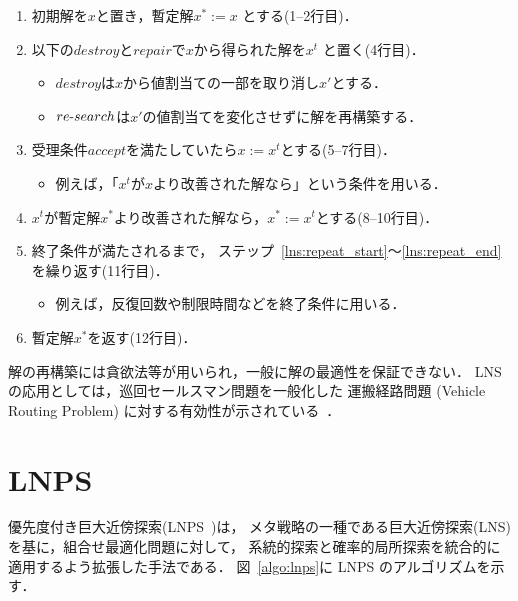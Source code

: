 \begin{enumerate}\compress
\item 初期解を$x$と置き，暫定解$x^{*} := x$ とする(1--2行目)．
\item \label{lns:repeat_start}
  以下の$destroy$と$repair$で$x$から得られた解を$x^{t}$
  と置く(4行目)．
  \begin{itemize}\compress
  \item $destroy$は$x$から値割当ての一部を取り消し$x'$とする．
  \item $re\mathchar`-search$は$x'$の値割当てを変化させずに解を再構築する．
  \end{itemize}
\item 受理条件$accept$を満たしていたら$x := x^{t}$とする(5--7行目)．
  \begin{itemize}\compress
  \item 例えば，「$x^{t}$が$x$より改善された解なら」という条件を用いる．
  \end{itemize}
\item \label{lns:repeat_end}
  $x^{t}$が暫定解$x^{*}$より改善された解なら，$x^{*} := x^{t}$とする(8--10行目)．
\item 終了条件が満たされるまで，
  ステップ~\ref{lns:repeat_start}〜\ref{lns:repeat_end}を繰り返す(11行目)．
  \begin{itemize}\compress
  \item 例えば，反復回数や制限時間などを終了条件に用いる．
  \end{itemize}
\item 暫定解$x^{*}$を返す(12行目)．
\end{enumerate}

解の再構築には貪欲法等が用いられ，一般に解の最適性を保証できない．
LNS の応用としては，巡回セールスマン問題を一般化した
運搬経路問題 (Vehicle Routing Problem)
に対する有効性が示されている~\cite{Pisinger10}．

\section{LNPS}

優先度付き巨大近傍探索(LNPS~\cite{jsai2021:kutaba})は，
メタ戦略の一種である巨大近傍探索(LNS)を基に，組合せ最適化問題に対して，
系統的探索と確率的局所探索を統合的に適用するよう拡張した手法である．
図~\ref{algo:lnps}に LNPS のアルゴリズムを示す．

